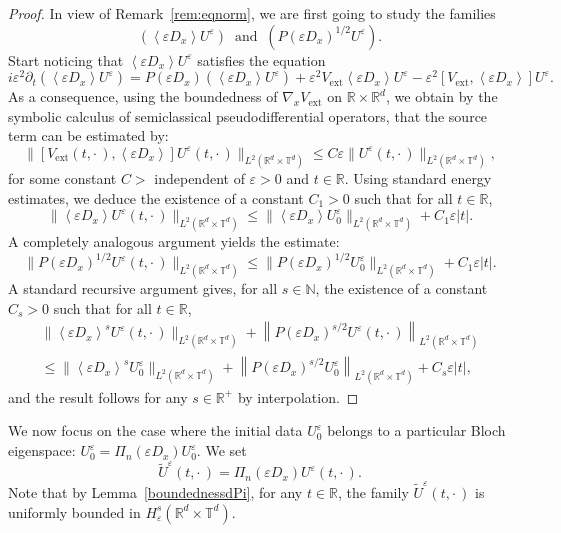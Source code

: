 \documentclass[AHL,Unicode,longabstracts]{cedram}
\DeclareMathOperator{\ext}{ext}
\newcommand*\R{{\mathbb R}}
\newcommand*\N{{\mathbb N}}
\newcommand*\T{{\mathbb T}}
\newcommand*\eps{\varepsilon}
\numberwithin{equation}{section}
\begin{document}
\begin{proof}
In view of Remark~\ref{rem:eqnorm},
we are first going to study the families
\[
(\left\langle\eps D_x\right\rangle U^\eps)\;\;\text{and}\;\;(P(\eps D_x)^{1/2}U^\eps).
\]
Start noticing that $\left\langle\eps D_x\right\rangle U^\eps$ satisfies the equation
\begin{equation}\label{eq:derU}
i\eps^2 \partial_t (\left\langle\eps D_x\right\rangle U^\eps) = P(\eps D_x) (\left\langle\eps D_x\right\rangle U^\eps) + \eps^2 V_{\ext} \left\langle\eps D_x\right\rangle U^\eps - \eps^2 [V_{\ext}, \left\langle\eps D_x\right\rangle] U^\eps.
\end{equation}
As a consequence, using the boundedness of $\nabla_x V_{\ext}$ on $\R\times\R^d$, we obtain by the symbolic calculus of semiclassical pseudodifferential operators, that the source term can be estimated by:
\[
\|[V_{\ext}(t,\cdot\,), \left\langle\eps D_x\right\rangle] U^\eps(t,\cdot\,)\|_{L^2(\R ^d \times\T^d)}\leq C\eps \|U^\eps(t,\cdot\,)\|_{L^2(\R ^d \times\T^d)},
\]
for some constant $C>$ independent of $\eps>0$ and $t\in\R$. Using standard energy estimates, we deduce the existence of a constant $C_1>0$ such that for all $t\in\R$,
\[
\| \left\langle\eps D_x\right\rangle U^\eps(t,\cdot\,)\| _{L^2(\R ^d \times\T^d)}\leq \| \left\langle\eps D_x\right\rangle U^\eps_0\| _{L^2(\R ^d \times\T^d)}+ C_1\eps |t|.
\]
A completely analogous argument yields the estimate:
\[
\| P(\eps D_x)^{1/2} U^\eps(t,\cdot\,)\| _{L^2(\R ^d \times\T^d)}\leq \| P(\eps D_x)^{1/2} U^\eps_0\| _{L^2(\R ^d \times\T^d)}+ C_1\eps |t|.
\]
A standard recursive argument gives, for all $s\in \N$, the existence of a constant $C_s>0$ such that for all $t\in\R$,
\begin{multline*}
\| \left\langle\eps D_x\right\rangle^s U^\eps(t,\cdot\,)\| _{L^2(\R ^d \times\T^d)}+\left\| P(\eps D_x)^{s/2} U^\eps(t,\cdot\,)\right\| _{L^2(\R ^d \times\T^d)}\\
\leq \| \left\langle\eps D_x\right\rangle^s U^\eps_0\| _{L^2(\R ^d \times\T^d)}+\left\| P(\eps D_x)^{s/2} U^\eps_0\right\| _{L^2(\R ^d \times\T^d)}+ C_s\eps |t|,
\end{multline*}
and the result follows for any $s\in\R^+$ by interpolation.
\end{proof}



We now focus on the case where the initial data $U^\eps_0$ belongs to a particular Bloch eigenspace: $U^\eps_0= \Pi_n(\eps D_x) U^\eps_0$. We set
\[
\widetilde U^\eps(t,\cdot\,)= \Pi_n(\eps D_x) U^\eps(t,\cdot\,).
\]
Note that by Lemma~\ref{boundednessdPi}, for any $t\in\R$, the family $\widetilde U^\eps (t,\cdot\,)$ is uniformly bounded in $H^s_\eps(\R^d\times \T^d)$.
\end{document}
